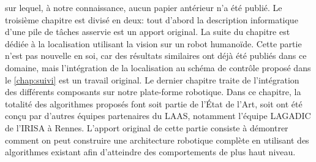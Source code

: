 sur lequel, à notre connaissance, aucun papier antérieur n'a été
publié. Le troisième chapitre est divisé en deux: tout d'abord la
description informatique d'une pile de tâches asservie est un apport
original. La suite du chapitre est dédiée à la localisation utilisant
la vision sur un robot humanoïde. Cette partie n'est pas nouvelle en
soi, car des résultats similaires ont déjà été publiés dans ce
domaine, mais l'intégration de la localisation au schéma de contrôle
proposé dans le \autoref{chap:suivi} est un travail original. Le
dernier chapitre traite de l'intégration des différents composants sur
notre plate-forme robotique. Dans ce chapitre, la totalité des
algorithmes proposés font soit partie de l'État de l'Art, soit ont été
conçu par d'autres équipes partenaires du LAAS, notamment l'équipe
LAGADIC de l'IRISA à Rennes. L'apport original de cette partie
consiste à démontrer comment on peut construire une architecture
robotique complète en utilisant des algorithmes existant afin
d'atteindre des comportements de plus haut niveau.


